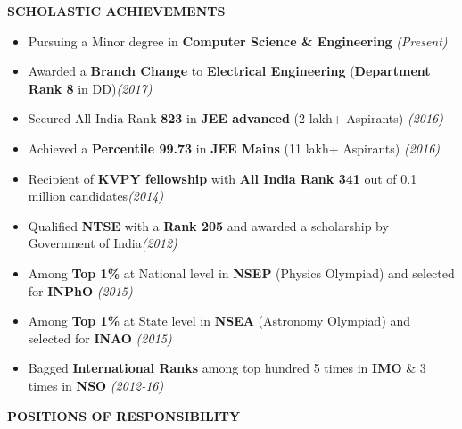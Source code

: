 \documentclass[11pt]{article}%
\begin{document}
\vspace*{3.5cm}

\begin{flushleft}
\bf{\bf{\LARGE{S}\Large{CHOLASTIC} \LARGE{A}\Large{CHIEVEMENTS}}}
\end{flushleft}
\vspace{-2mm}
\hline

\begin{itemize}
\setlength\itemsep{0.01em}


\vspace{-0.2cm}
\item Pursuing a Minor degree in \textbf{Computer Science \& Engineering} \hfill {{{\em {(Present)}}}}
\item Awarded a \textbf{Branch Change} to \textbf{Electrical Engineering} (\textbf{Department Rank 8} in DD)\hfill {{{\em {(2017)}}}}
\item Secured All India Rank \textbf{823} in \textbf{JEE advanced} (2 lakh+ Aspirants) \hfill {{{\em {(2016)}}}}
\item Achieved a \textbf{Percentile 99.73} in \textbf{JEE Mains} (11 lakh+ Aspirants) \hfill {{{\em {(2016)}}}}
\item Recipient of \textbf{KVPY fellowship} with \textbf{All India Rank 341} out of 0.1 million candidates\hfill {{{\em {(2014)}}}}
\item Qualified \textbf{NTSE} with a \textbf{Rank 205} and awarded a scholarship by Government of India\hfill {{{\em {(2012)}}}}
\item Among \textbf{Top 1\%} at National level in \textbf{NSEP} (Physics Olympiad) and selected for \textbf{INPhO} \hfill {{{\em {(2015)}}}}
\item Among \textbf{Top 1\%} at State level in \textbf{NSEA} (Astronomy Olympiad) and selected for \textbf{INAO} \hfill {{{\em {(2015)}}}}
\item \nohyphens{Bagged \textbf{International Ranks} among top hundred 5 times in \textbf{IMO} \& 3 times in \textbf{NSO} \hfill {{{\em {(2012-16)}}}}}


\end{itemize}


\vspace{-5mm}





\begin{flushleft}
\bf{\LARGE{P}\Large{OSITIONS} \LARGE{O}\Large{F} \LARGE{R}\Large{ESPONSIBILITY}}
\vspace{-2mm}
\end{flushleft}
\hline
\end{document}

